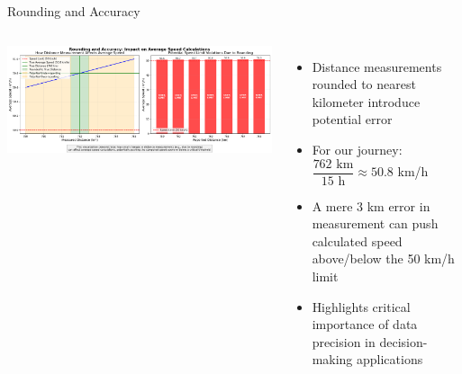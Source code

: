 \documentclass{beamer}
\begin{document}
\begin{frame}{Rounding and Accuracy}
  \begin{columns}
      \includegraphics[width=\textwidth]{figures/rounding_accuracy_demo.png}
      \begin{itemize}
        \item Distance measurements rounded to nearest kilometer introduce potential error
        \item For our journey: $\dfrac{762\text{ km}}{15\text{ h}} \approx 50.8$ km/h
        \item A mere 3 km error in measurement can push calculated speed above/below the 50 km/h limit
        \item Highlights critical importance of data precision in decision-making applications
      \end{itemize}
  \end{columns}
\end{frame}
\end{document}
